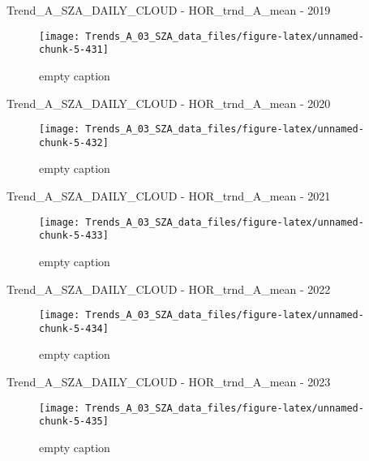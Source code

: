 \documentclass[
  10pt,
  a4paper,oneside]{article}
\begin{document}
Trend\_A\_SZA\_DAILY\_CLOUD - HOR\_trnd\_A\_mean - 2019

\begin{figure}[!ht]

{\centering \texttt{[image: Trends\_A\_03\_SZA\_data\_files/figure-latex/unnamed-chunk-5-431]} 

}

\caption{ empty caption }\label{fig:unnamed-chunk-5-431}
\end{figure}

Trend\_A\_SZA\_DAILY\_CLOUD - HOR\_trnd\_A\_mean - 2020

\begin{figure}[!ht]

{\centering \texttt{[image: Trends\_A\_03\_SZA\_data\_files/figure-latex/unnamed-chunk-5-432]} 

}

\caption{ empty caption }\label{fig:unnamed-chunk-5-432}
\end{figure}

Trend\_A\_SZA\_DAILY\_CLOUD - HOR\_trnd\_A\_mean - 2021

\begin{figure}[!ht]

{\centering \texttt{[image: Trends\_A\_03\_SZA\_data\_files/figure-latex/unnamed-chunk-5-433]} 

}

\caption{ empty caption }\label{fig:unnamed-chunk-5-433}
\end{figure}

Trend\_A\_SZA\_DAILY\_CLOUD - HOR\_trnd\_A\_mean - 2022

\begin{figure}[!ht]

{\centering \texttt{[image: Trends\_A\_03\_SZA\_data\_files/figure-latex/unnamed-chunk-5-434]} 

}

\caption{ empty caption }\label{fig:unnamed-chunk-5-434}
\end{figure}

Trend\_A\_SZA\_DAILY\_CLOUD - HOR\_trnd\_A\_mean - 2023

\begin{figure}[!ht]

{\centering \texttt{[image: Trends\_A\_03\_SZA\_data\_files/figure-latex/unnamed-chunk-5-435]} 

}

\caption{ empty caption }\label{fig:unnamed-chunk-5-435}
\end{figure}
\end{document}
